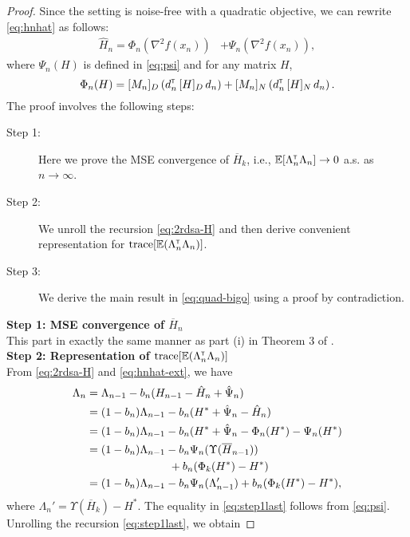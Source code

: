 \begin{proof}
Since the setting is noise-free with a quadratic objective, we can rewrite \eqref{eq:hnhat} as follows:
\begin{align}
 \widehat H_n =    \Phi_n(\nabla^2 f(x_n)) &+\Psi_{n}(\nabla^2 f(x_n)),\label{eq:hnhat-ext}
\end{align}
where $\Psi_n(H)$ is defined in \eqref{eq:psi} and for any matrix $H$, 
$$\Phi_{n}(H) = [M_n]_{D}\left(d_{n}^\mathsf{\scriptscriptstyle T} \, [H]_{D} \, d_{n}\right) +  [M_n]_{N}\left(d_{n}^\mathsf{\scriptscriptstyle T} \, [H]_{N} \, d_{n}\right).$$
The proof involves the following steps:
\begin{description}
  \item[Step 1:] Here we prove the MSE convergence of $\overline H_k$, i.e., $\mathbb{E} [\Lambda_n^\mathsf{\scriptscriptstyle T} \Lambda_n] \rightarrow 0$ a.s. as $n\rightarrow \infty$.
  \item[Step 2:] We unroll the recursion \eqref{eq:2rdsa-H} and then derive convenient representation for $\text{trace}[\mathbb{E} (\Lambda_n ^\mathsf{\scriptscriptstyle T} \Lambda_n)]$.
  \item[Step 3:] We derive the main result in \eqref{eq:quad-bigo} using a proof by contradiction. 
\end{description}
\noindent\textbf{Step 1: MSE convergence of $\overline H_n$} \\
This part in exactly the same manner as part (i) in Theorem 3 of \cite{spall-jacobian}.\\
\noindent\textbf{Step 2: Representation of $\text{trace}[\mathbb{E} (\Lambda_n ^\mathsf{\scriptscriptstyle T} \Lambda_n)]$} \\
 From \eqref{eq:2rdsa-H} and \eqref{eq:hnhat-ext},  we have
 \begin{align}
 \Lambda_n &= \Lambda_{n-1} - b_n ( H_{n-1} - \hat H_n + \hat \Psi_n) \nonumber\\
&= (1-b_n) \Lambda_{n-1} - b_n (H^* + \hat \Psi_n - \hat H_n ) \nonumber\\&= (1-b_n) \Lambda_{n-1} - b_n (H^*+\hat \Psi_n -\Phi_n(H^*) - \Psi_n(H^*)\nonumber\\&= (1-b_n) \Lambda_{n-1} - b_n \Psi_n(\Upsilon(\overline H_{n-1})) \nonumber\\& \hspace{2.6cm}+ b_n (\Phi_k(H^*) - H^*)\nonumber\\
&= (1-b_n) \Lambda_{n-1} - b_n\Psi_n(\Lambda_{n-1}')+ b_n (\Phi_k(H^*) - H^*),\label{eq:step1last}
 \end{align}
where $\Lambda_n' = \Upsilon(\overline H_k) - H^*$.
The equality in \eqref{eq:step1last} follows from \eqref{eq:psi}. 
Unrolling the recursion \eqref{eq:step1last}, we obtain 

\end{proof}
